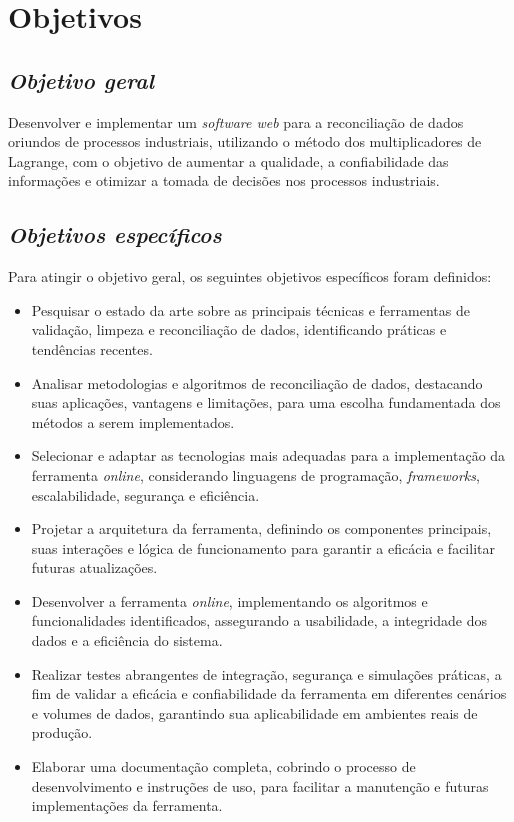 \section{Objetivos}
\subsection{\textit{Objetivo geral}}

Desenvolver e implementar um \textit{software web} para a reconciliação de dados oriundos de processos industriais, utilizando o método dos multiplicadores de Lagrange, com o objetivo de aumentar a qualidade, a confiabilidade das informações e otimizar a tomada de decisões nos processos industriais.

\subsection{\textit{Objetivos específicos}}

Para atingir o objetivo geral, os seguintes objetivos específicos foram definidos:

\begin{itemize}
    \item Pesquisar o estado da arte sobre as principais técnicas e ferramentas de validação, limpeza e reconciliação de dados, identificando práticas e tendências recentes.
    \item Analisar metodologias e algoritmos de reconciliação de dados, destacando suas aplicações, vantagens e limitações, para uma escolha fundamentada dos métodos a serem implementados.
    \item Selecionar e adaptar as tecnologias mais adequadas para a implementação da ferramenta \textit{online}, considerando linguagens de programação, \textit{frameworks}, escalabilidade, segurança e eficiência.
    \item Projetar a arquitetura da ferramenta, definindo os componentes principais, suas interações e lógica de funcionamento para garantir a eficácia e facilitar futuras atualizações.
    \item Desenvolver a ferramenta \textit{online}, implementando os algoritmos e funcionalidades identificados, assegurando a usabilidade, a integridade dos dados e a eficiência do sistema.
    \item Realizar testes abrangentes de integração, segurança e simulações práticas, a fim de validar a eficácia e confiabilidade da ferramenta em diferentes cenários e volumes de dados, garantindo sua aplicabilidade em ambientes reais de produção.
    \item Elaborar uma documentação completa, cobrindo o processo de desenvolvimento e instruções de uso, para facilitar a manutenção e futuras implementações da ferramenta.
\end{itemize}


